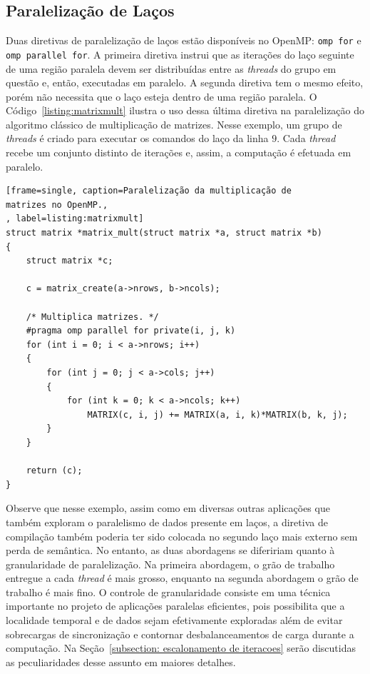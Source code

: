 \documentclass{SBCbookchapter}
\begin{document}
	\subsection{Paralelização de Laços}
	\label{subsection: paralelização de lacos}

		Duas diretivas de paralelização de laços estão disponíveis no
		OpenMP: \texttt{omp for} e \texttt{omp parallel for}. A primeira
		diretiva instrui que as iterações do laço seguinte de uma região
		paralela devem ser distribuídas entre as \textit{threads} do grupo em questão
		e, então, executadas em paralelo. A segunda diretiva tem o mesmo
		efeito, porém não necessita que o laço esteja dentro de uma região
		paralela. O Código~\ref{listing:matrixmult} ilustra o uso dessa última
		diretiva na paralelização do algoritmo clássico de multiplicação de
		matrizes. Nesse exemplo, um grupo de \textit{threads} é criado para
		executar os comandos do laço da linha $9$. Cada \textit{thread}
		recebe um conjunto distinto de iterações e, assim, a
		computação é efetuada em paralelo. 

\begin{lstlisting}[frame=single, caption=Paralelização da multiplicação de
matrizes no OpenMP.,
, label=listing:matrixmult]
struct matrix *matrix_mult(struct matrix *a, struct matrix *b)
{
	struct matrix *c;

	c = matrix_create(a->nrows, b->ncols);

	/* Multiplica matrizes. */
	#pragma omp parallel for private(i, j, k)
	for (int i = 0; i < a->nrows; i++)
	{
		for (int j = 0; j < a->cols; j++)
		{
			for (int k = 0; k < a->ncols; k++)
				MATRIX(c, i, j) += MATRIX(a, i, k)*MATRIX(b, k, j);
		}
	}

	return (c);
}
\end{lstlisting}

		Observe que nesse exemplo, assim como em diversas outras aplicações que
		também exploram o paralelismo de dados presente em laços, a diretiva de
		compilação também poderia ter sido colocada no segundo laço mais externo
		sem perda de semântica. No entanto, as duas abordagens se difeririam
		quanto à granularidade de paralelização. Na primeira abordagem, o grão
		de trabalho entregue a cada \textit{thread} é mais grosso, enquanto na segunda
		abordagem o grão de trabalho é mais fino. O controle de granularidade
		consiste em uma técnica importante no projeto de aplicações paralelas
		eficientes, pois possibilita que a localidade temporal e de dados sejam efetivamente
		exploradas além de evitar sobrecargas de sincronização e contornar desbalanceamentos
		de carga durante a computação. Na Seção~\ref{subsection: escalonamento de iteracoes}
		serão discutidas as peculiaridades desse assunto em maiores detalhes.
\end{document}
